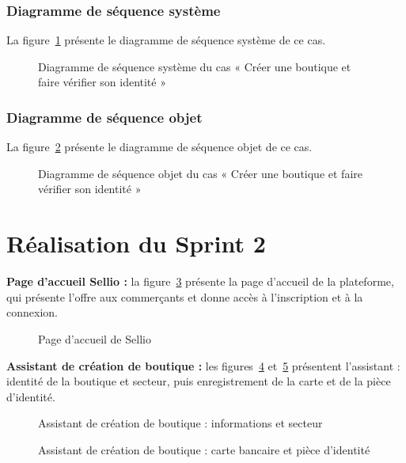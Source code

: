 \subsubsection{Diagramme de séquence système}
La figure~\ref{fig:dss-kyc} présente le diagramme de séquence système de ce cas.
\begin{figure}[H]
    \centering
    \caption{Diagramme de séquence système du cas « Créer une boutique et faire vérifier son identité »}
    \label{fig:dss-kyc}
\end{figure}

\subsubsection{Diagramme de séquence objet}
La figure~\ref{fig:dso-kyc} présente le diagramme de séquence objet de ce cas.
\begin{figure}[H]
    \centering
    \caption{Diagramme de séquence objet du cas « Créer une boutique et faire vérifier son identité »}
    \label{fig:dso-kyc}
\end{figure}

\section{Réalisation du Sprint 2}
\textbf{Page d'accueil Sellio :} la figure~\ref{fig:ui-sellio-home} présente la page d'accueil de la plateforme, qui présente l'offre aux commerçants et donne accès à l'inscription et à la connexion.
\begin{figure}[H]
    \centering
    \caption{Page d'accueil de Sellio}
    \label{fig:ui-sellio-home}
\end{figure}

\textbf{Assistant de création de boutique :} les figures~\ref{fig:ui-wizard-1} et~\ref{fig:ui-wizard-2} présentent l'assistant : identité de la boutique et secteur, puis enregistrement de la carte et de la pièce d'identité.
\begin{figure}[H]
    \centering
    \caption{Assistant de création de boutique : informations et secteur}
    \label{fig:ui-wizard-1}
\end{figure}
\begin{figure}[H]
    \centering
    \caption{Assistant de création de boutique : carte bancaire et pièce d'identité}
    \label{fig:ui-wizard-2}
\end{figure}

